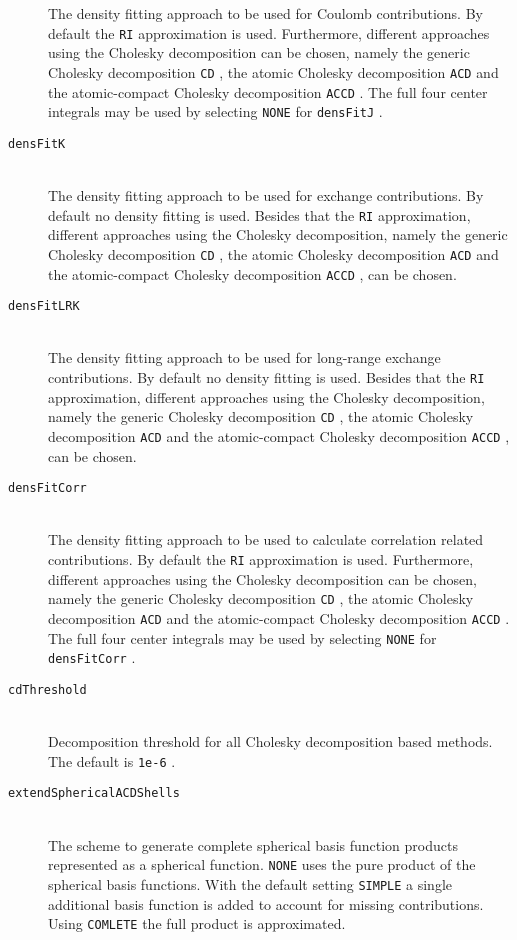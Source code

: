 \documentclass[bibliography=totocnumbered,a4paper,10pt,oneside]{scrbook}
\newcommand{\ttt}[1]{%
  \begingroup\setlength{\fboxsep}{1pt}%
  \colorbox{serenity-green!30}{\texttt{\hspace*{2pt}\vphantom{(g}#1\hspace*{2pt}}}%
  \endgroup
}
\begin{document}
\begin{description}
    The density fitting approach to be used for Coulomb contributions. By default the \ttt{RI} approximation is used. Furthermore, different approaches using the Cholesky decomposition can be chosen, namely the generic Cholesky decomposition \ttt{CD}, the atomic Cholesky decomposition \ttt{ACD} and the atomic-compact Cholesky decomposition \ttt{ACCD}. The full four center integrals may be used by selecting \ttt{NONE} for \ttt{densFitJ}.
    \item [\texttt{densFitK}]\hfill \\
    The density fitting approach to be used for exchange contributions. By default no density fitting is used. Besides that the \ttt{RI} approximation, different approaches using the Cholesky decomposition, namely the generic Cholesky decomposition \ttt{CD}, the atomic Cholesky decomposition \ttt{ACD} and the atomic-compact Cholesky decomposition \ttt{ACCD}, can be chosen.
    \item [\texttt{densFitLRK}]\hfill \\
    The density fitting approach to be used for long-range exchange contributions. By default no density fitting is used. Besides that the \ttt{RI} approximation, different approaches using the Cholesky decomposition, namely the generic Cholesky decomposition \ttt{CD}, the atomic Cholesky decomposition \ttt{ACD} and the atomic-compact Cholesky decomposition \ttt{ACCD}, can be chosen.
    \item [\texttt{densFitCorr}]\hfill \\
    The density fitting approach to be used to calculate correlation related contributions. By default the \ttt{RI} approximation is used. Furthermore, different approaches using the Cholesky decomposition can be chosen, namely the generic Cholesky decomposition \ttt{CD}, the atomic Cholesky decomposition \ttt{ACD} and the atomic-compact Cholesky decomposition \ttt{ACCD}. The full four center integrals may be used by selecting \ttt{NONE} for \ttt{densFitCorr}.
    \item [\texttt{cdThreshold}]\hfill\\
    Decomposition threshold for all Cholesky decomposition based methods. The default is \ttt{1e-6}.
    \item [\texttt{extendSphericalACDShells}]\hfill\\
    The scheme to generate complete spherical basis function products represented as a spherical function. \ttt{NONE} uses the pure product of the spherical basis functions. With the default setting \ttt{SIMPLE} a single additional basis function is added to account for missing contributions. Using \ttt{COMLETE} the full product is approximated.

\end{description}
\end{document}
